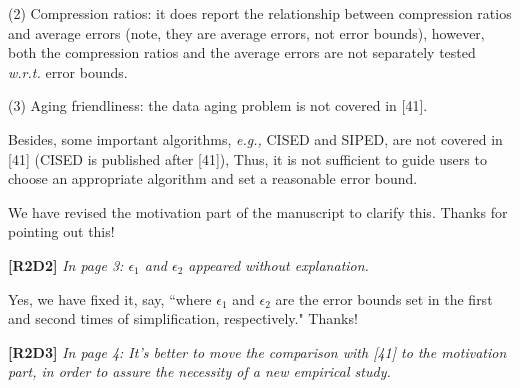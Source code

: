 \documentclass{letter}
\newcommand{\eg}{\emph{e.g.,}\xspace}
\newcommand{\wrt}{\emph{w.r.t.}\xspace}
\begin{document}
{(2) Compression ratios: it does report the relationship between compression ratios and average errors (note, they are average errors, not error bounds), however, both the compression ratios and the average errors are not separately tested \wrt error bounds.

(3) Aging friendliness: the data aging problem is not covered in [41]. 

Besides, some important algorithms, \eg CISED and SIPED, are not covered in [41] (CISED is published after [41]), Thus, it is not sufficient to guide users to choose an appropriate algorithm and set a reasonable error bound. 

We have revised the motivation part of the manuscript to clarify this.
Thanks for pointing out this!



\textbf{[R2D2]} \emph{In page 3: $\epsilon_1$ and $\epsilon_2$ appeared without explanation.}

Yes, we have fixed it, say, ``{where $\epsilon_1$ and $\epsilon_2$ are the error bounds set in the first and second times of simplification, respectively.}" 
Thanks!

\textbf{[R2D3]} \emph{ In page 4: It’s better to move the comparison with [41] to the motivation part, in order to assure the necessity of a new empirical study.}

}
\end{document}
